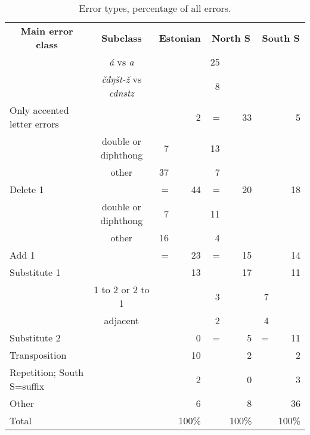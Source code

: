 \documentclass{flammie}
\newcommand{\samit}{\mbox{t\hspace{-.35em}-}} %
\begin{document}
\begin{table}[]
    \centering
\begin{tabular}{ l c |r r|r r|r r }
    \toprule
    \multicolumn{1}{c}{\bfseries Main error class} &
    \multicolumn{1}{c}{\bfseries Subclass } &
    \multicolumn{2}{c}{\bfseries Estonian} &
    \multicolumn{2}{c}{\bfseries North S} &
    \multicolumn{2}{c}{\bfseries South S} \\
\cmidrule(lr){1-8}
                            &  \textit{á} vs \textit{a}      &    &    & 25 &    &   &     \\
                            & \textit{čđŋš\samit{}ž} vs \textit{cdnstz}   &    &    &  8 &    &   &     \\
Only accented letter errors	&                    &    &  2 &  = & 33 &   &   5 \\
\cmidrule(lr){1-8}
                            & double or diphthong&  7 &    & 13 &    &   &     \\
                            & other              & 37 &    &  7 &    &   &     \\
Delete 1	                    &                    &  = & 44 &  = & 20 &   &  18 \\
\cmidrule(lr){1-8}
                            & double or diphthong&  7 &    & 11 &    &   &     \\
                            & other              & 16 &    &  4 &    &   &     \\
Add 1                       &                    &  = & 23 &  = & 15 &   &  14 \\
\cmidrule(lr){1-8}
Substitute 1                &                    &    & 13 &    & 17 &   &  11 \\
\cmidrule(lr){1-8}
                            & 1 to 2 or 2 to 1   &    &    &  3 &    & 7 &     \\
                            & adjacent           &    &    &  2 &    & 4 &     \\
Substitute 2                &                    &    &  0 &  = &  5 & = &  11 \\
\cmidrule(lr){1-8}
Transposition               &                    &    & 10 &    &  2 &   &   2 \\
\cmidrule(lr){1-8}
Repetition; South S=suffix  &                    &    &  2 &    &  0 &   &   3 \\
\cmidrule(lr){1-8}
Other                       &                    &    &  6 &    &  8 &   &  36 \\
\bottomrule
Total                       &                    &    & 100\% & &100\%&  & 100\%\\
\bottomrule
\end{tabular}
    \caption{Error types, percentage of all errors.\label{tab:error_classes}}
\end{table}
\end{document}
